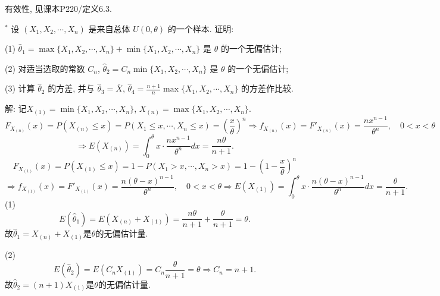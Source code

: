 \documentclass[standard]{ExBook}
\renewenvironment{shaded}{%
  \def\FrameCommand{\fboxsep=\FrameSep \colorbox{shadecolor}}%
  \MakeFramed{\advance\hsize-\width \FrameRestore}%
}{%
  \endMakeFramed
}
\begin{document}
\begin{qitems}
\textcolor{themeColor}{\selectfont {} 有效性, 见课本P220/定义6.3.}

\vspace{2.5cm-5em}

    \begin{bbox}
    \begin{shaded}
        \qitem$^*$
设 \((X_1, X_2, \cdots, X_n)\) 是来自总体 \(U(0, \theta)\) 的一个样本. 证明:

(1) \(\hat{\theta}_1 = \max\{X_1, X_2, \cdots, X_n\} + \min\{X_1, X_2, \cdots, X_n\}\) 是 \(\theta\) 的一个无偏估计;

(2) 对适当选取的常数 \(C_n\), \(\hat{\theta}_2 = C_n \min\{X_1, X_2, \cdots, X_n\}\) 是 \(\theta\) 的一个无偏估计;

(3) 计算 \(\hat{\theta}_2\) 的方差, 并与 \(\hat{\theta}_3 = \overline{X}\), \(\hat{\theta}_4 = \displaystyle\frac{n+1}{n} \max\{X_1, X_2, \cdots, X_n\}\) 的方差作比较.
    \end{shaded}
    \end{bbox}

\vspace{\dimexpr2.5cm-5em\relax}

解: 记$X_{(1)}=\min\{X_1,X_2,\cdots,X_n\}$, $X_{(n)}=\max\{X_1,X_2,\cdots,X_n\}$.
$$
F_{X_{(n)}}(x)=P(X_{(n)}\leq x)=P(X_1\leq x,\cdots,X_n\leq x)=\left(\frac{x}{\theta}\right)^n
\Longrightarrow
f_{X_{(n)}}(x)=F'_{X_{(n)}}(x)=\frac{nx^{n-1}}{\theta^n},\quad 0<x<\theta
$$
$$
\Longrightarrow
E(X_{(n)})=\int_{0}^{\theta}x\cdot\frac{nx^{n-1}}{\theta^n}dx=\frac{n\theta}{n+1}.
$$
$$
F_{X_{(1)}}(x)=P(X_{(1)}\leq x)=1-P(X_1>x,\cdots,X_n>x)=1-\left(1-\frac{x}{\theta}\right)^n
$$
$$
\Longrightarrow
f_{X_{(1)}}(x)=F'_{X_{(1)}}(x)=\frac{n(\theta-x)^{n-1}}{\theta^n},\quad 0<x<\theta
\Longrightarrow
E(X_{(1)})=\int_{0}^{\theta}x\cdot\frac{n(\theta-x)^{n-1}}{\theta^n}dx=\frac{\theta}{n+1}.
$$
(1)
$$
E(\hat{\theta}_1)=E(X_{(n)}+X_{(1)})
=\frac{n\theta}{n+1}+\frac{\theta}{n+1}
=\theta.
$$
故$\hat{\theta}_1=X_{(n)}+X_{(1)}$是$\theta$的无偏估计量.

(2)
$$
E(\hat{\theta}_2)=E(C_nX_{(1)})=C_n\frac{\theta}{n+1}=\theta
\Longrightarrow
C_n=n+1.
$$
故$\hat{\theta}_2=(n+1)X_{(1)}$是$\theta$的无偏估计量.


\end{qitems}
\end{document}
